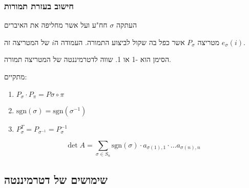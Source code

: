 \documentclass{tstextbook}
\begin{document}
\subsubsection{חישוב בעזרת תמורות}

\begin{definition}[תמורה]
העתקה \(\sigma\) חח"ע ועל אשר מחליפה את האיברים

\end{definition}
\begin{definition}
מטריצה \(P_\sigma\) אשר כפל בה שקול לביצוע התמורה. העמודה ה\(i\) של המטריצה זה \(e_\sigma(i)\).

\end{definition}
\begin{definition}
הסימן הוא -1 או 1. שווה לדטרמיננטה של המטריצה תמורה.

\end{definition}
\begin{proposition}
מתקיים:

  \begin{enumerate}
    \item \(P_\sigma \cdot P_\pi = P\sigma \circ \pi\)


    \item \(\text{sgn}(\sigma) = \text{sgn}(\sigma^{-1})\)


    \item \(P_\sigma ^T = P_{\sigma^{-1}} = P_\sigma ^{-1}\)


  \end{enumerate}
\end{proposition}
\begin{proposition}
$$\det A = \sum_{\sigma\in S_n} \text{sgn}(\sigma) \cdot a_{\sigma(1),1}\cdot \dots a_{\sigma(n),n} $$

\end{proposition}
\subsection{שימושים של דטרמיננטה}
\end{document}

